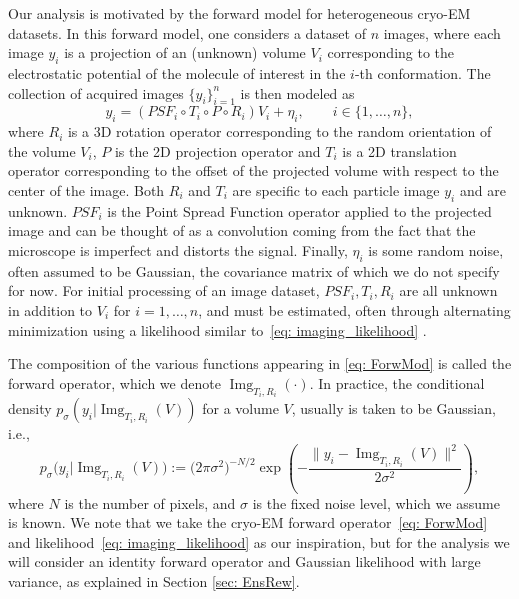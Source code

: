 \documentclass[12pt]{iopart}
\theoremstyle{remark}
\begin{document}
Our analysis is motivated by the forward model for heterogeneous cryo-EM datasets. In this forward model, one considers a dataset of $n$ images, where each image $y_i$ is a projection of an (unknown) volume $V_i$ corresponding to the electrostatic potential of the molecule of interest in the $i$-th conformation.   
The  collection of acquired images $\{y_i\}_{i=1}^n$ is then modeled as
\begin{equation}
\label{eq: ForwMod}
y_i =(PSF_i \circ T_i \circ P \circ R_i)V_i +\eta_i, \qquad i \in \{1,\ldots, n\},
\end{equation}
 where $R_i$ is a 3D rotation operator corresponding to the random orientation of the volume $V_i$, $P$ is the 2D projection operator and $T_i$ is a 2D translation operator corresponding to the offset of the projected volume with respect to the center of the image. Both $R_i$ and $T_i$ are specific to each particle image $y_i$ and are unknown. $PSF_i$ is the Point Spread Function operator applied to the projected image and can be thought of as a convolution coming from the fact that the microscope is imperfect and distorts the signal.  Finally, $\eta_i$ is  some random noise, often assumed to be Gaussian, the covariance matrix of which we do not specify for now. 
 For initial processing of an image dataset, $PSF_i, T_i, R_i$ are all unknown in addition to $V_i$ for $i=1,\ldots, n$, and must be estimated, often through alternating minimization using a likelihood similar to~\eqref{eq: imaging_likelihood} \citep{singer2020computational}.


 
The composition of the various functions appearing in \eqref{eq: ForwMod} is called the forward operator, which we denote   $\operatorname{Img}_{T_i, R_i}(\cdot)$.
In practice, the conditional density $p_\sigma(y_i\vert\operatorname{Img}_{T_i, R_i}(V))$  for a volume $V$, usually is taken to be Gaussian, i.e.,
\begin{equation}
\label{eq: imaging_likelihood}
	p_\sigma\big(y_i\vert \operatorname{Img}_{T_i, R_i}(V)\big) := \big(2\pi\sigma^2\big)^{-N/2} \exp\left(- \frac{\|y_i -\operatorname{Img}_{T_i, R_i}(V)\|^2}{2\sigma^2}\right),
\end{equation}
where $N$ is the number of pixels, and $\sigma$ is the fixed noise level, which we assume is known.
We note that we take the cryo-EM forward operator~\eqref{eq: ForwMod} and likelihood~\eqref{eq: imaging_likelihood}  as our inspiration, but for the analysis we will consider an identity forward operator and Gaussian likelihood with large variance, as explained in Section \ref{sec: EnsRew}.
\end{document}
